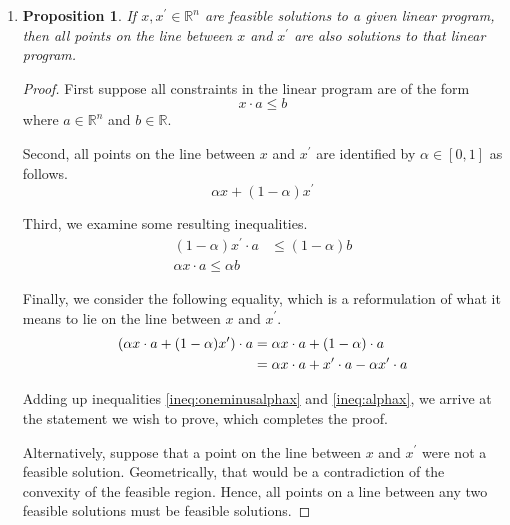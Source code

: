 \documentclass[letterpaper,11pt]{article}
\newtheorem{proposition}{Proposition}
\newcommand{\R}{\mathbb{R}}
\begin{document}
\begin{enumerate}
    \item

        \begin{proposition}
            If $x,x^\prime \in \R^n$ are feasible solutions to a given linear
            program, then all points on the line between $x$ and $x^\prime$ are
            also solutions to that linear program.
        \end{proposition}

        \begin{proof}
            First suppose all constraints in the linear program are of the form
            $$
            x \cdot a \leq b
            $$
            where $a \in \R^n$ and $b \in \R$.

            Second, all points on the line between $x$ and $x^\prime$ are identified by
            $\alpha \in [0,1]$ as follows.
            $$
            \alpha x + (1-\alpha)x^\prime
            $$

            Third, we examine some resulting inequalities.
            \begin{align}
                (1 - \alpha)x^\prime \cdot a & \leq (1 - \alpha) b \label{ineq:oneminusalphax} \\
                \alpha x \cdot a \leq \alpha b \label{ineq:alphax}
            \end{align}

            Finally, we consider the following equality, which is a
            reformulation of what it means to lie on the line between $x$ and
            $x^\prime$.
            \begin{align}
                (\alpha x \cdot a + (1 - \alpha) x^\prime) \cdot a
                &= \alpha x \cdot a + (1 - \alpha) \cdot a \notag \\
                &= \alpha x \cdot a + x^\prime \cdot a - \alpha x^\prime \cdot a \label{eq:qed}
            \end{align}

            Adding up inequalities \eqref{ineq:oneminusalphax} and
            \eqref{ineq:alphax}, we arrive at the statement we wish to prove,
            which completes the proof.

            Alternatively, suppose that a point on the line between $x$ and
            $x^\prime$ were not a feasible solution. Geometrically, that would
            be a contradiction of the convexity of the feasible region. Hence,
            all points on a line between any two feasible solutions must be
            feasible solutions.
        \end{proof}

\end{enumerate}
\end{document}
